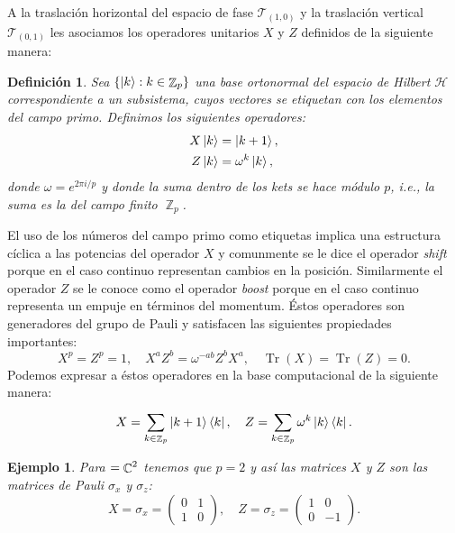 \documentclass[a4paper]{report}
\DeclareMathOperator{\C}{\mathbb{C}}
\DeclareMathOperator{\Z}{\mathbb{Z}}
\let\H\relax
\DeclareMathOperator{\H}{\mathcal H}
\DeclareMathOperator{\Tr}{Tr}
\newtheorem{definition}{Definición}
\newtheorem{example}{Ejemplo}
\begin{document}
  A la traslación horizontal del espacio de fase $\mathcal
  T_{(1,0)}$ y la traslación vertical $\mathcal T_{(0,1)}$
  les asociamos los operadores unitarios $X$ y $Z$ definidos
  de la siguiente manera:
  \begin{definition}
    Sea $\{\ket k : k \in \Z_p\}$ una base ortonormal del
    espacio de Hilbert $\mathcal H$ correspondiente a un
    subsistema, cuyos vectores se etiquetan con los elementos
    del campo primo. Definimos los siguientes operadores:
    \begin{align}
      X \ket k
      &= \ket{k + 1}, \\
      Z \ket k
      &= \omega^{k} \ket k,
    \end{align}
    donde $\omega = e^{2\pi i / p}$ y donde la suma dentro
    de los kets se hace módulo $p$, i.e., la suma es la del
    campo finito $\Z_p$.
  \end{definition}
  El uso de los números del campo primo como etiquetas
  implica una estructura cíclica a las potencias del
  operador $X$ y comunmente se le dice el operador
  \textit{shift} porque en el caso continuo representan
  cambios en la posición. Similarmente el operador $Z$ se le
  conoce como el operador \textit{boost} porque en el caso
  continuo representa un empuje en términos del momentum.
  Éstos operadores son generadores del grupo de Pauli y
  satisfacen las siguientes propiedades importantes:
  \begin{equation}
    X^{p} = Z^{p} = 1,
    \quad
    X^{a} Z^{b} = \omega^{-ab} Z^{b} X^{a},
    \quad
    \Tr(X) = \Tr(Z) = 0.
  \end{equation}
  Podemos expresar a éstos operadores en la base
  computacional de la siguiente manera:
  \begin{equation}
    X = \sum_{k \in \Z_p}^{} \ket{k+1}\bra{k}, \\
    \quad
    Z = \sum_{k \in \Z_p}^{} \omega^{k} \ket k \bra k.
  \end{equation}
  \begin{example}
    Para $\H = \C^{2}$ tenemos que $p = 2$ y así las
    matrices $X$ y $Z$ son las matrices de Pauli $\sigma_x$
    y $\sigma_z$:
    \[
      X = \sigma_x =
      \begin{pmatrix} 0 & 1 \\ 1 & 0 \end{pmatrix},
      \quad
      Z = \sigma_z =
      \begin{pmatrix} 1 & 0 \\ 0 & -1 \end{pmatrix}. 
    \] 
  \end{example}
\end{document}

